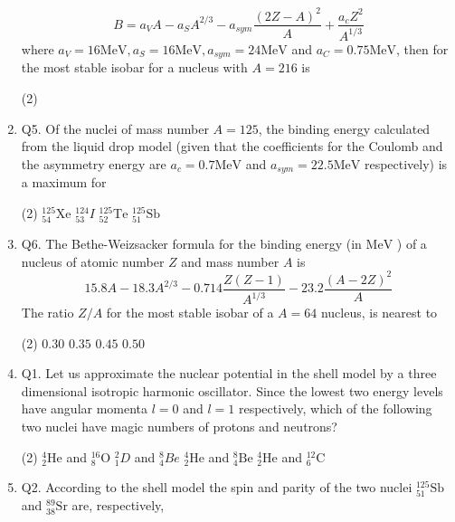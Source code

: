 \begin{enumerate}
	$$
	B=a_V A-a_S A^{2 / 3}-a_{s y m} \frac{(2 Z-A)^2}{A}+\frac{a_c Z^2}{A^{1 / 3}}
	$$
	where $a_V=16 \mathrm{MeV}, a_S=16 \mathrm{MeV}, a_{s y m}=24 \mathrm{MeV}$ and $a_C=0.75 \mathrm{MeV}$, then for the most stable isobar for a nucleus with $A=216$ is
	{}
 \begin{tasks}(2)
\end{tasks}
	\item Q5. Of the nuclei of mass number $A=125$, the binding energy calculated from the liquid drop model (given that the coefficients for the Coulomb and the asymmetry energy are $a_c=0.7 \mathrm{MeV}$ and $a_{s y m}=22.5 \mathrm{MeV}$ respectively) is a maximum for
	{}
 \begin{tasks}(2)
	\task[\textbf{a.}]${ }_{54}^{125} \mathrm{Xe}$
	\task[\textbf{b.}]${ }_{53}^{124} I$
	\task[\textbf{c.}]${ }_{52}^{125} \mathrm{Te}$
	\task[\textbf{d.}]  ${ }_{51}^{125} \mathrm{Sb}$
\end{tasks}
	\item Q6. The Bethe-Weizsacker formula for the binding energy (in $\mathrm{MeV}$ ) of a nucleus of atomic number $Z$ and mass number $A$ is
	$$
	15.8 A-18.3 A^{2 / 3}-0.714 \frac{Z(Z-1)}{A^{1 / 3}}-23.2 \frac{(A-2 Z)^2}{A}
	$$
	The ratio $Z / A$ for the most stable isobar of a $A=64$ nucleus, is nearest to
	 \begin{tasks}(2)
		\task[\textbf{a.}]$0.30$
		\task[\textbf{b.}] $0.35$
		\task[\textbf{c.}]$0.45$
		\task[\textbf{d.}]$0.50$ 
	\end{tasks}
	\item Q1. Let us approximate the nuclear potential in the shell model by a three dimensional isotropic harmonic oscillator. Since the lowest two energy levels have angular momenta $l=0$ and $l=1$ respectively, which of the following two nuclei have magic numbers of protons and neutrons?
	{}
	 \begin{tasks}(2)
		\task[\textbf{a.}]${ }_2^4 \mathrm{He}$ and ${ }_8^{16} \mathrm{O}$
		\task[\textbf{b.}]${ }_1^2 D$ and ${ }_4^8 B e$
		\task[\textbf{c.}]${ }_2^4 \mathrm{He}$ and ${ }_4^8 \mathrm{Be}$
		\task[\textbf{d.}] ${ }_2^4 \mathrm{He}$ and ${ }_6^{12} \mathrm{C}$
	\end{tasks}
	\item Q2. According to the shell model the spin and parity of the two nuclei ${ }_{51}^{125} \mathrm{Sb}$ and ${ }_{38}^{89} \mathrm{Sr}$ are, respectively,

\end{enumerate}
